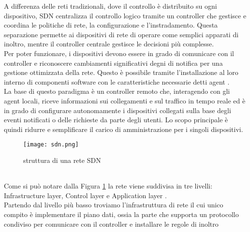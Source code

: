A differenza delle reti tradizionali, dove il controllo è distribuito su ogni dispositivo, SDN centralizza il controllo logico tramite un controller che gestisce e coordina le politiche di rete, la configurazione e l'instradamento.
Questa separazione permette ai dispositivi di rete di operare come semplici apparati di inoltro, mentre il controller centrale gestisce le decisioni più complesse. %
\\Per poter funzionare, i dispositivi devono essere in grado di comunicare con il controller e riconoscere cambiamenti significativi degni di notifica per una gestione ottimizzata della rete. %
Questo è possibile tramite l'installazione al loro interno di componenti software con le caratteristiche necessarie
detti agent \cite{tesiSDN:2017}.
\\La base di questo paradigma è un controller remoto che, interagendo con gli agent
locali, riceve informazioni sui collegamenti e sul traffico in tempo reale ed è in grado di
configurare autonomamente i dispositivi collegati sulla base degli eventi notificati o delle richieste da parte degli utenti. Lo scopo
principale è quindi ridurre e semplificare il carico di amministrazione per i singoli dispositivi.
\begin{figure}[h]
    \centering
   \texttt{[image: sdn.png]}
    \caption{struttura di una rete SDN \cite{fotosdn}}
    \label{fig:sdnF}
\end{figure}
\\Come si può notare dalla Figura \ref{fig:sdnF} la rete viene suddivisa in tre livelli: Infrastructure layer, Control layer e Application layer \cite{sdnlayers}.
\\Partendo dal livello più basso troviamo l'infrastruttura di rete il cui unico compito è implementare il piano dati, ossia la parte che supporta un protocollo condiviso per comunicare con il controller e installare le regole di inoltro
